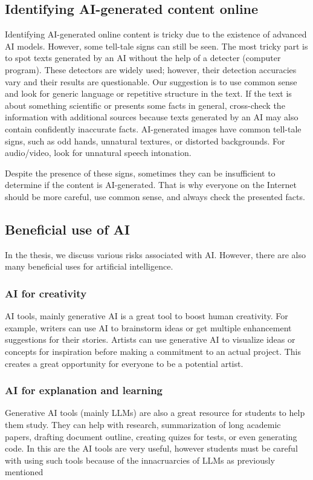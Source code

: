 \subsection*{Identifying AI-generated content online}
Identifying AI-generated online content is tricky due to the existence of advanced AI models. However, some tell-tale signs can still be seen. The most tricky part is to spot texts generated by an AI without the help of a detecter (computer program). These detectors are widely used; however, their detection accuracies vary and their results are questionable. Our suggestion is to use common sense and look for generic language or repetitive structure in the text. If the text is about something scientific or presents some facts in general, cross-check the information with additional sources because texts generated by an AI may also contain confidently inaccurate facts. AI-generated images have common tell-tale signs, such as odd hands, unnatural textures, or distorted backgrounds. For audio/video, look for unnatural speech intonation.

Despite the presence of these signs, sometimes they can be insufficient to determine if the content is AI-generated. That is why everyone on the Internet should be more careful, use common sense, and always check the presented facts.

\subsection*{Beneficial use of AI}
In the thesis, we discuss various risks associated with AI. However, there are also many beneficial uses for artificial intelligence.

\subsubsection*{AI for creativity}
AI tools, mainly generative AI is a great tool to boost human creativity. For example, writers can use AI to brainstorm ideas or get multiple enhancement suggestions for their stories. Artists can use generative AI to visualize ideas or concepts for inspiration before making a commitment to an actual project. This creates a great opportunity for everyone to be a potential artist.

\subsubsection*{AI for explanation and learning}
Generative AI tools (mainly LLMs) are also a great resource for students to help them study. They can help with research, summarization of long academic papers, drafting document outline, creating quizes for tests, or even generating code. In this are the AI tools are very useful, however students must be careful with using such tools because of the innacruarcies of LLMs as previously mentioned


